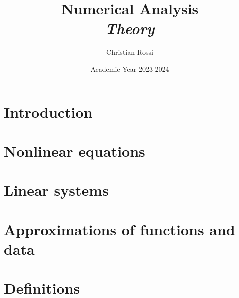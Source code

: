 \documentclass[12pt, a4paper]{report}
\title{Numerical Analysis \\ \textit{Theory}}
\author{Christian Rossi}
\date{Academic Year 2023-2024}
\begin{document}
    \maketitle

    \newpage

    

    \cleardoublepage

    \tableofcontents

    \cleardoublepage

    \chapter{Introduction}
    
    

    \chapter{Nonlinear equations}
    
    
    
    
    
    
    
    
    

    \chapter{Linear systems}
    
    
    
    

    \chapter{Approximations of functions and data}


    \chapter{Definitions}
    
    
    
\end{document}
